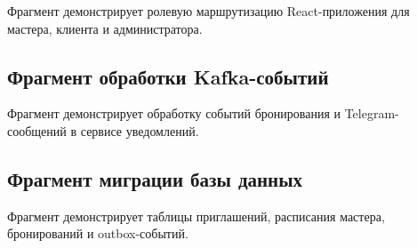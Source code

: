 Фрагмент демонстрирует ролевую маршрутизацию React-приложения для мастера, клиента и администратора.



\subsection*{Фрагмент обработки Kafka-событий}

Фрагмент демонстрирует обработку событий бронирования и Telegram-сообщений в сервисе уведомлений.



\subsection*{Фрагмент миграции базы данных}

Фрагмент демонстрирует таблицы приглашений, расписания мастера, бронирований и outbox-событий.



\fi
